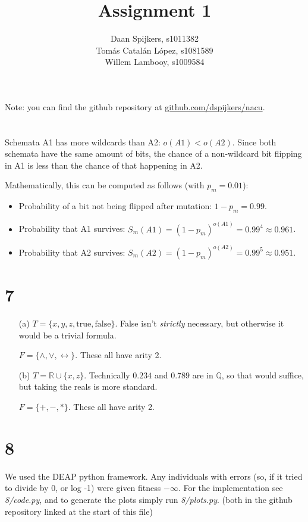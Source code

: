 \documentclass{scrartcl}
\title{Assignment 1}
\author{Daan Spijkers, s1011382\\ Tomás Catalán López, s1081589\\ Willem Lambooy, s1009584}
\begin{document}
\maketitle
Note: you can find the github repository at
\url{github.com/dspijkers/nacu}.

\section{}
Schemata A1 has more wildcards than A2: $o(A1) < o(A2)$. Since both schemata have the same amount of bits, the chance of a non-wildcard bit flipping in A1 is less than the chance of that happening in A2.

Mathematically, this can be computed as follows (with $p_m=0.01$):
\begin{itemize}
  \item Probability of a bit not being flipped after mutation: $1-p_m=0.99$.
  \item Probability that A1 survives: $S_m(A1)=(1-p_m)^{o(A1)}=0.99^4\approx0.961$.
  \item Probability that A2 survives: $S_m(A2)=(1-p_m)^{o(A2)}=0.99^5\approx0.951$.
\end{itemize}

\section*{7}
\begin{itemize}
  \item[(a)]
    $T = \{x, y, z, \text{true}, \text{false}\}$. False isn't
    \emph{strictly} necessary, but otherwise it would be a trivial
    formula.

    $F = \{\land, \lor, \leftrightarrow\}$. These all have arity 2.

  \item[(b)]
    $T = \mathbb{R} \cup \{x, z\}$. Technically $0.234$ and $0.789$ are in
    $\mathbb{Q}$, so that would suffice, but taking the reals is more
    standard.

    $F = \{+, -, *\}$. These all have arity 2.

\end{itemize}

\section*{8}
We used the DEAP python framework. Any individuals with errors (so, if it
tried to divide by 0, or log -1) were given fitness $-\infty$. For the
implementation see \emph{8/code.py}, and to generate the plots simply run
\emph{8/plots.py}. (both in the github repository linked at the start of
this file)
\end{document}
